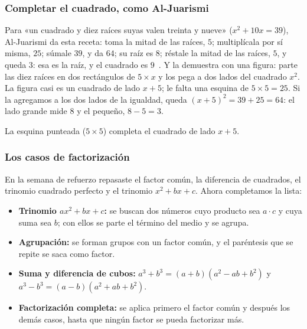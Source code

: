 \documentclass[11pt]{article}
\begin{document}
\subsubsection*{Completar el cuadrado, como Al-Juarismi}

Para «un cuadrado y diez raíces suyas valen treinta y nueve»
($x^2 + 10x = 39$), Al-Juarismi da esta receta: toma la mitad de las raíces,
$5$; multiplícala por sí misma, $25$; súmale $39$, y da $64$; su raíz es $8$;
réstale la mitad de las raíces, $5$, y queda $3$: esa es la raíz, y el
cuadrado es $9$~\cite{rosen}. Y la demuestra con una figura: parte las diez
raíces en dos rectángulos de $5 \times x$ y los pega a dos lados del cuadrado
$x^2$. La figura casi es un cuadrado de lado $x + 5$; le falta una esquina de
$5 \times 5 = 25$. Si la agregamos a los dos lados de la igualdad, queda
$(x + 5)^2 = 39 + 25 = 64$: el lado grande mide $8$ y el pequeño,
$8 - 5 = 3$.

\begin{center}

{\small La esquina punteada ($5 \times 5$) completa el cuadrado de lado $x + 5$.}
\end{center}

\subsubsection*{Los casos de factorización}

En la semana de refuerzo repasaste el factor común, la diferencia de
cuadrados, el trinomio cuadrado perfecto y el trinomio $x^2 + bx + c$. Ahora
completamos la lista:

\begin{itemize}
  \item \textbf{Trinomio $ax^2 + bx + c$:} se buscan dos números cuyo
        producto sea $a \cdot c$ y cuya suma sea $b$; con ellos se parte el
        término del medio y se agrupa.
  \item \textbf{Agrupación:} se forman grupos con un factor común, y el
        paréntesis que se repite se saca como factor.
  \item \textbf{Suma y diferencia de cubos:}
        $a^3 + b^3 = (a + b)(a^2 - ab + b^2)$ y
        $a^3 - b^3 = (a - b)(a^2 + ab + b^2)$.
  \item \textbf{Factorización completa:} se aplica primero el factor común y
        después los demás casos, hasta que ningún factor se pueda
        factorizar más.
\end{itemize}
\end{document}
